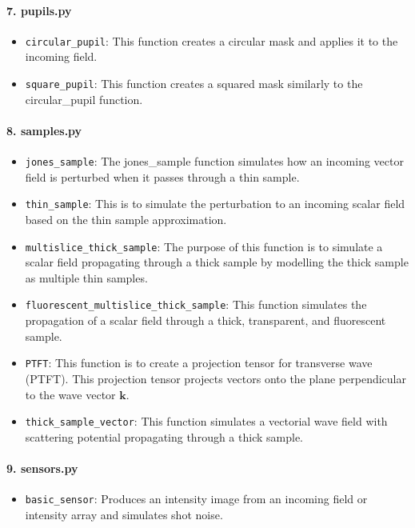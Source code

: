 \documentclass[a4paper,12pt]{report}
\begin{document}
\paragraph*{7. \textbf{pupils.py}}
\begin{itemize}
  \item \texttt{circular\_pupil}: This function creates a circular mask and applies it to the incoming field.
  \item \texttt{square\_pupil}: This function creates a squared mask similarly to the circular\_pupil function.
\end{itemize}

\paragraph*{8. \textbf{samples.py}}
\begin{itemize}
  \item \texttt{jones\_sample}: The jones\_sample function simulates how an incoming vector field is perturbed when it passes through a thin sample.
  \item \texttt{thin\_sample}: This is to simulate the perturbation to an incoming scalar field based on the thin sample approximation.
  \item \texttt{multislice\_thick\_sample}: The purpose of this function is to simulate a scalar field propagating through a thick sample by modelling the thick sample as multiple thin samples.
  \item \texttt{fluorescent\_multislice\_thick\_sample}: This function simulates the propagation of a scalar field through a thick, transparent, and fluorescent sample.
  \item \texttt{PTFT}: This function is to create a projection tensor for transverse wave (PTFT). This projection tensor projects vectors onto the plane perpendicular to the wave vector $\mathbf{k}$.
  \item \texttt{thick\_sample\_vector}: This function simulates a vectorial wave field with scattering potential propagating through a thick sample.
\end{itemize}

\paragraph*{9. \textbf{sensors.py}}
\begin{itemize}
  \item \texttt{basic\_sensor}: Produces an intensity image from an incoming field or intensity array and simulates shot noise.
\end{itemize}
\end{document}
